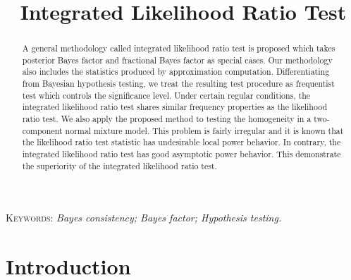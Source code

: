 \documentclass[11pt]{article}
\title{Integrated Likelihood Ratio Test}
\theoremstyle{plain}
\theoremstyle{definition}
\theoremstyle{remark}
\begin{document}
\maketitle
\begin{abstract}
    A general methodology called integrated likelihood ratio test is proposed which takes posterior Bayes factor and fractional Bayes factor as special cases.
    Our methodology also includes the statistics produced by approximation computation.
    Differentiating from Bayesian hypothesis testing, we treat the resulting test procedure as frequentist test which controls the significance level.
    Under certain regular conditions, the integrated likelihood ratio test shares similar frequency properties as the likelihood ratio test.
    We also apply the proposed method to testing the homogeneity in a two-component normal mixture model.
    This problem is fairly irregular and it is known that the likelihood ratio test statistic has undesirable local power behavior.
    In contrary, the integrated likelihood ratio test has good asymptotic power behavior.
    This demonstrate the superiority of the integrated likelihood ratio test.
\end{abstract}
{\small \textsc{Keywords:} {\em
    Bayes consistency;
   Bayes factor;
   Hypothesis testing.
}}



\section{Introduction}




\end{document}

